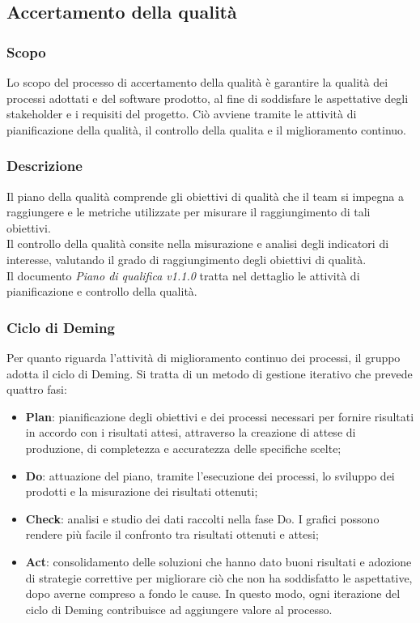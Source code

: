 \subsection{Accertamento della qualità}
\subsubsection{Scopo}
Lo scopo del processo di accertamento della qualità è garantire la qualità dei
processi adottati e del software prodotto, al fine di soddisfare le aspettative
degli stakeholder e i requisiti del progetto. Ciò avviene tramite le attività
di pianificazione della qualità, il controllo della qualita e il miglioramento
continuo.
\subsubsection{Descrizione}
Il piano della qualità comprende gli obiettivi di qualità che il team si
impegna a raggiungere e le metriche utilizzate per misurare il raggiungimento
di tali obiettivi. \\ Il controllo della qualità consite nella misurazione e
analisi degli indicatori di interesse, valutando il grado di raggiungimento
degli obiettivi di qualità. \\ Il documento \textit{Piano di qualifica v1.1.0} tratta
nel dettaglio le attività di pianificazione e controllo della qualità. \\
\subsubsection{Ciclo di Deming}
Per quanto riguarda l'attività di miglioramento continuo dei processi, il
gruppo adotta il ciclo di Deming. Si tratta di un metodo di gestione iterativo
che prevede quattro fasi:
\begin{itemize}
      \item \textbf{Plan}: pianificazione degli obiettivi e dei processi necessari per fornire
            risultati in accordo con i risultati attesi, attraverso la creazione di attese di
            produzione, di completezza e accuratezza delle specifiche scelte;
      \item \textbf{Do}: attuazione del piano, tramite l'esecuzione dei processi,
            lo sviluppo dei prodotti e la misurazione dei risultati ottenuti;
      \item \textbf{Check}: analisi e studio dei dati raccolti nella fase Do.
            I grafici possono rendere più facile il confronto tra risultati ottenuti e attesi;
      \item \textbf{Act}: consolidamento delle soluzioni che hanno dato buoni risultati e
            adozione di strategie correttive per migliorare ciò che non ha soddisfatto le aspettative,
            dopo averne compreso a fondo le cause. In questo modo, ogni iterazione del ciclo di Deming
            contribuisce ad aggiungere valore al processo.
\end{itemize}
